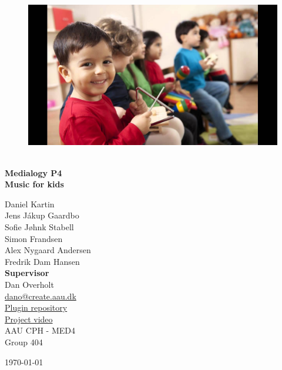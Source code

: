 \begin{titlepage}
			
\addtolength{\voffset}{2cm}

\begin{figure}[H]
\centering
\vspace{2cm}	%
\includegraphics[width=0.99\linewidth]{figure/Frontpage/frontpage}
\end{figure}

\mbox{}
\vfill
\renewcommand{\familydefault}{\sfdefault} \normalfont %
\HRule\\[0.1cm]
\textbf{{\small Medialogy P4\\ {\Huge Music for kids}}} \hspace{0.15cm}\\
\HRule\smallskip{}
\begin{multicols}{2}
{\Large Daniel Kartin\\Jens Jákup Gaardbo\\Sofie Jøhnk Stabell\\Simon Frandsen\\Alex Nygaard Andersen\\Fredrik Dam Hansen\columnbreak}\\
\setlength{\parskip}{2.4cm}
{\Large{\textbf{Supervisor}\\Dan Overholt\\\href{mailto:dano@create.aau.dk}{\color{blue}dano@create.aau.dk}}}\medskip\\
\href{https://github.com/totalfreak/medialogyp4code}{\color{blue}Plugin repository}\\
\href{https:google.com}{\color{blue}Project video}\medskip
\\\small AAU CPH - 
MED4 \\
Group 404\\
\end{multicols}
\today
\renewcommand{\familydefault}{\rmdefault} \normalfont %
\end{titlepage}


